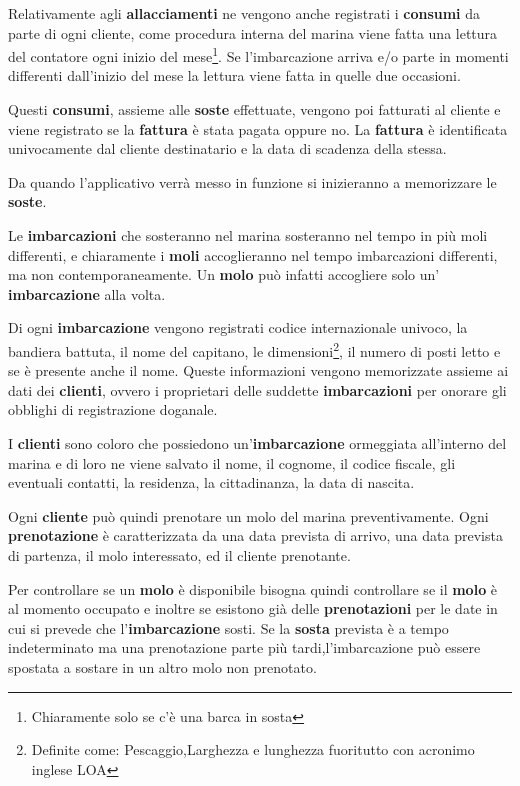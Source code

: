 Relativamente agli \textbf{allacciamenti} ne vengono anche registrati i \textbf{consumi} da parte di ogni cliente, come procedura interna del marina viene fatta una lettura del contatore ogni inizio del mese\footnote{Chiaramente solo se c'è una barca in sosta}. Se l'imbarcazione arriva e/o parte in momenti differenti dall'inizio del mese la lettura viene fatta in quelle due occasioni.

Questi \textbf{consumi}, assieme alle \textbf{soste} effettuate, vengono poi fatturati al cliente e viene registrato se la \textbf{fattura} è stata pagata oppure no.
La \textbf{fattura} è identificata univocamente dal cliente destinatario e la data di scadenza della stessa.

Da quando l'applicativo verrà messo in funzione si inizieranno a memorizzare le \textbf{soste}.

Le \textbf{imbarcazioni} che sosteranno nel marina sosteranno nel tempo in più moli differenti, e chiaramente i \textbf{moli} accoglieranno nel tempo imbarcazioni differenti, ma non contemporaneamente. Un \textbf{molo} può infatti accogliere solo un' \textbf{imbarcazione} alla volta.

Di ogni \textbf{imbarcazione} vengono registrati codice internazionale univoco, la bandiera battuta, il nome del capitano, le dimensioni\footnote{Definite come: Pescaggio,Larghezza e lunghezza fuoritutto con acronimo inglese LOA}, il numero di posti letto e se è presente anche il nome. Queste informazioni vengono memorizzate assieme ai dati dei \textbf{clienti}, ovvero i proprietari delle suddette \textbf{imbarcazioni} per onorare gli obblighi di registrazione doganale.

I \textbf{clienti} sono coloro che possiedono un'\textbf{imbarcazione} ormeggiata all'interno del marina e di loro ne viene salvato il nome, il cognome, il codice fiscale, gli eventuali contatti, la residenza, la cittadinanza, la data di nascita.

Ogni \textbf{cliente} può quindi prenotare un molo del marina preventivamente. Ogni \textbf{prenotazione} è caratterizzata da una data prevista di arrivo, una data prevista di partenza, il molo interessato, ed il cliente prenotante.

Per controllare se un \textbf{molo} è disponibile bisogna quindi controllare se il \textbf{molo} è al momento occupato e inoltre se esistono già delle \textbf{prenotazioni} per le date in cui si prevede che l'\textbf{imbarcazione} sosti. Se la \textbf{sosta} prevista è a tempo indeterminato ma una prenotazione parte più tardi,l'imbarcazione può essere spostata a sostare in un altro molo non prenotato.

